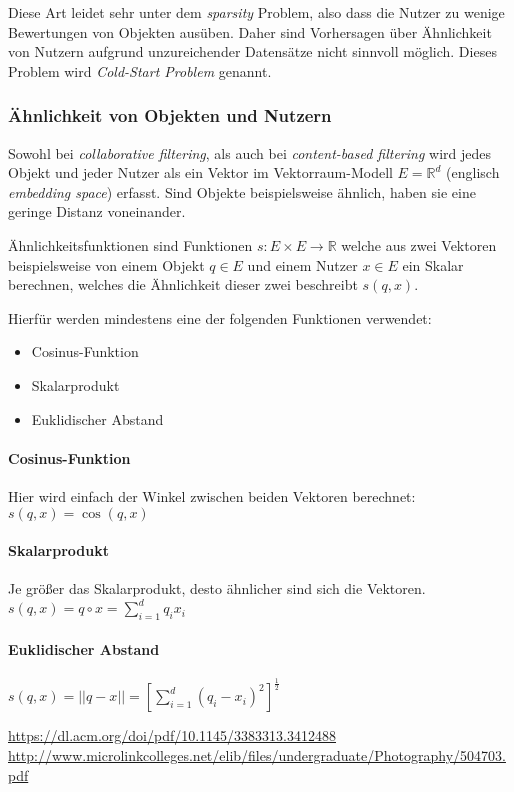 Diese Art leidet sehr unter dem \textit{sparsity} Problem, also dass die Nutzer zu wenige Bewertungen von Objekten ausüben. Daher sind Vorhersagen über Ähnlichkeit von Nutzern aufgrund unzureichender Datensätze nicht sinnvoll möglich. Dieses Problem wird \textit{Cold-Start Problem} genannt.

\subsubsection{Ähnlichkeit von Objekten und Nutzern}
Sowohl bei \textit{collaborative filtering}, als auch bei \textit{content-based filtering} wird jedes Objekt und jeder Nutzer als ein Vektor im Vektorraum-Modell $E = \mathbb{R}^d$ (englisch \textit{embedding space}) erfasst. Sind Objekte beispielsweise ähnlich, haben sie eine geringe Distanz voneinander. 

Ähnlichkeitsfunktionen sind Funktionen $s : E \times E  \rightarrow \mathbb{R}$ welche aus zwei Vektoren beispielsweise von einem Objekt $q \in E$ und einem Nutzer $x \in E$ ein Skalar berechnen, welches die Ähnlichkeit dieser zwei beschreibt $s(q,x)$.

Hierfür werden mindestens eine der folgenden Funktionen verwendet:
\begin{itemize}
	\item Cosinus-Funktion
	\item Skalarprodukt
	\item Euklidischer Abstand
\end{itemize} 

\paragraph{Cosinus-Funktion}
Hier wird einfach der Winkel zwischen beiden Vektoren berechnet: $s(q,x) = \cos(q,x)$

\paragraph{Skalarprodukt}
Je größer das Skalarprodukt, desto ähnlicher sind sich die Vektoren. $s(q,x) = q \circ x = \sum_{i=1}^{d}q_i x_i$ 

\paragraph{Euklidischer Abstand}
$s(q,x) = ||q-x|| = [\sum_{i=1}^{d}(q_i - x_i)^2]^\frac{1}{2}$





\url{https://dl.acm.org/doi/pdf/10.1145/3383313.3412488}
\url{http://www.microlinkcolleges.net/elib/files/undergraduate/Photography/504703.pdf}